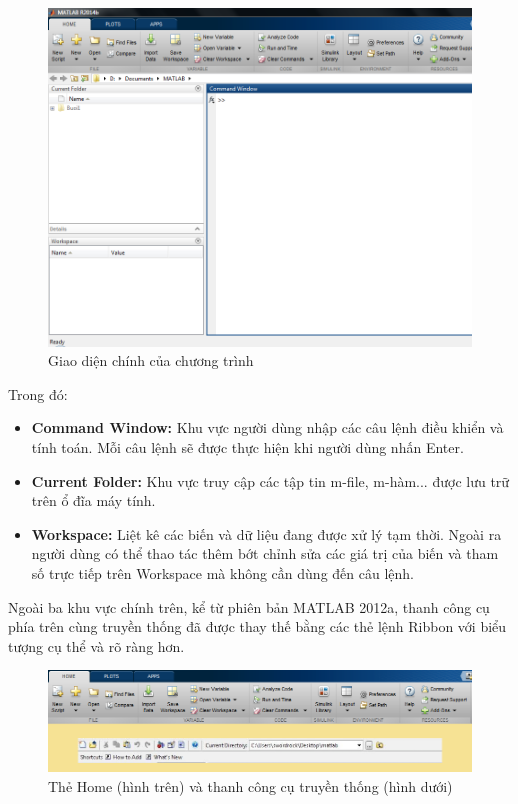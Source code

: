 \documentclass[12pt,a4paper]{article}
\begin{document}
\begin{center}
	\begin{figure}[htp]
	\begin{center}
		\includegraphics[scale=.6]{hinhtieuluan/pic2}
	\end{center}
		\caption{Giao diện chính của chương trình}
		\label{refhinh2}
	\end{figure}
\end{center}
Trong đó:\\
\begin{itemize}
	\item \textbf{Command Window:} Khu vực người dùng nhập các câu lệnh điều khiển và tính toán. Mỗi câu lệnh sẽ được thực hiện khi người dùng nhấn Enter.
	\item \textbf{Current Folder:} Khu vực truy cập các tập tin m-file, m-hàm... được lưu trữ trên ổ đĩa máy tính.
	\item \textbf{Workspace:} Liệt kê các biến và dữ liệu đang được xử lý tạm thời. Ngoài ra người dùng có thể thao tác thêm bớt chỉnh sửa các giá trị của biến và tham số trực tiếp trên Workspace mà không cần dùng đến câu lệnh.
\end{itemize}
Ngoài ba khu vực chính trên, kể từ phiên bản MATLAB 2012a, thanh công cụ phía trên cùng truyền thống đã được thay thế bằng các thẻ lệnh Ribbon với biểu tượng cụ thể và rõ ràng hơn.\\
\begin{center}
	\begin{figure}[htp]
		\begin{center}
		\includegraphics[scale=.5]{hinhtieuluan/pic3}
		\end{center}
		\caption{Thẻ Home (hình trên) và thanh công cụ truyền thống (hình dưới)}
		\label{refhinh3}
	\end{figure}
\end{center}
\end{document}
